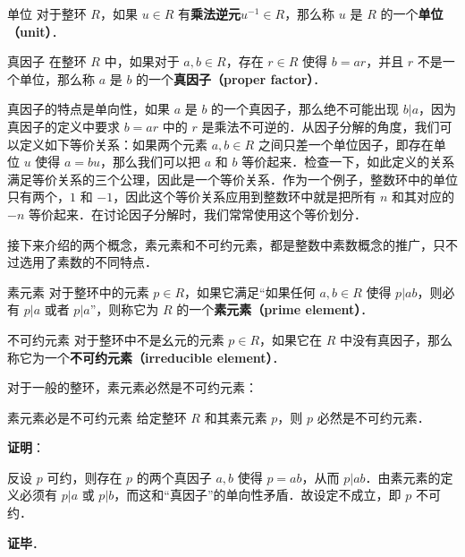 \begin{definition}{单位}
对于整环 $R$，如果 $u\in R$ 有\textbf{乘法逆元}$u^{-1}\in R$，那么称 $u$ 是 $R$ 的一个\textbf{单位（unit）}．
\end{definition}

\begin{definition}{真因子}
在整环 $R$ 中，如果对于 $a, b\in R$，存在 $r\in R$ 使得 $b=ar$，并且 $r$ 不是一个单位，那么称 $a$ 是 $b$ 的一个\textbf{真因子（proper factor）}．
\end{definition}

真因子的特点是单向性，如果 $a$ 是 $b$ 的一个真因子，那么绝不可能出现 $b|a$，因为真因子的定义中要求 $b=ar$ 中的 $r$ 是乘法不可逆的．从因子分解的角度，我们可以定义如下等价关系：如果两个元素 $a, b\in R$ 之间只差一个单位因子，即存在单位 $u$ 使得 $a=bu$，那么我们可以把 $a$ 和 $b$ 等价起来．检查一下，如此定义的关系满足等价关系的三个公理，因此是一个等价关系．作为一个例子，整数环中的单位只有两个，$1$ 和 $-1$，因此这个等价关系应用到整数环中就是把所有 $n$ 和其对应的 $-n$ 等价起来．在讨论因子分解时，我们常常使用这个等价划分．

接下来介绍的两个概念，素元素和不可约元素，都是整数中素数概念的推广，只不过选用了素数的不同特点．

\begin{definition}{素元素}
对于整环中的元素 $p\in R$，如果它满足“如果任何 $a, b\in R$ 使得 $p|ab$，则必有 $p|a$ 或者 $p|a$”，则称它为 $R$ 的一个\textbf{素元素（prime element）}．
\end{definition}

\begin{definition}{不可约元素}
对于整环中不是幺元的元素 $p\in R$，如果它在 $R$ 中没有真因子，那么称它为一个\textbf{不可约元素（irreducible element）}．
\end{definition}

对于一般的整环，素元素必然是不可约元素：

\begin{theorem}{素元素必是不可约元素}
给定整环 $R$ 和其素元素 $p$，则 $p$ 必然是不可约元素．
\end{theorem}

\textbf{证明}：

反设 $p$ 可约，则存在 $p$ 的两个真因子 $a, b$ 使得 $p=ab$，从而 $p|ab$．由素元素的定义必须有 $p|a$ 或 $p|b$，而这和“真因子”的单向性矛盾．故设定不成立，即 $p$ 不可约．

\textbf{证毕}．



